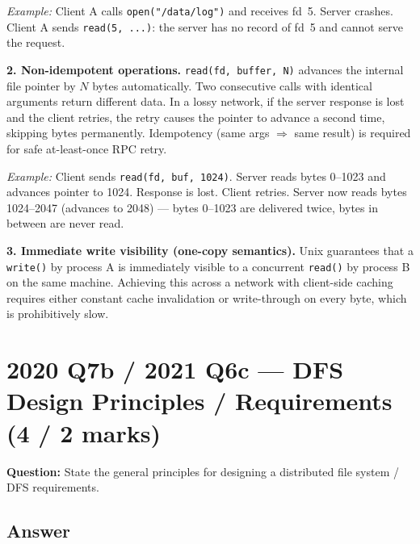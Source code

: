 \documentclass[12pt,a4paper]{article}
\begin{document}
\textit{Example:} Client A calls \texttt{open("/data/log")} and receives fd~5. Server crashes. Client A sends \texttt{read(5, ...)}: the server has no record of fd~5 and cannot serve the request.

\textbf{2. Non-idempotent operations.}
\texttt{read(fd, buffer, N)} advances the internal file pointer by $N$ bytes automatically. Two consecutive calls with identical arguments return different data. In a lossy network, if the server response is lost and the client retries, the retry causes the pointer to advance a second time, skipping bytes permanently. Idempotency (same args $\Rightarrow$ same result) is required for safe at-least-once RPC retry.

\textit{Example:} Client sends \texttt{read(fd, buf, 1024)}. Server reads bytes 0--1023 and advances pointer to 1024. Response is lost. Client retries. Server now reads bytes 1024--2047 (advances to 2048) --- bytes 0--1023 are delivered twice, bytes in between are never read.

\textbf{3. Immediate write visibility (one-copy semantics).}
Unix guarantees that a \texttt{write()} by process A is immediately visible to a concurrent \texttt{read()} by process B on the same machine. Achieving this across a network with client-side caching requires either constant cache invalidation or write-through on every byte, which is prohibitively slow.

\section{2020 Q7b / 2021 Q6c --- DFS Design Principles / Requirements (4 / 2 marks)}

\textbf{Question:} State the general principles for designing a distributed file system / DFS requirements.

\subsection*{Answer}
\end{document}
